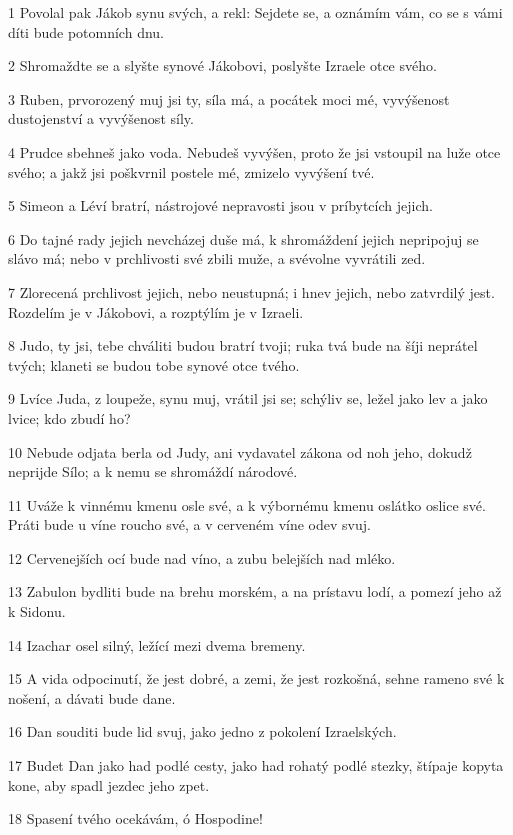 \par 1 Povolal pak Jákob synu svých, a rekl: Sejdete se, a oznámím vám, co se s vámi díti bude potomních dnu.
\par 2 Shromaždte se a slyšte synové Jákobovi, poslyšte Izraele otce svého.
\par 3 Ruben, prvorozený muj jsi ty, síla má, a pocátek moci mé, vyvýšenost dustojenství a vyvýšenost síly.
\par 4 Prudce sbehneš jako voda. Nebudeš vyvýšen, proto že jsi vstoupil na luže otce svého; a jakž jsi poškvrnil postele mé, zmizelo vyvýšení tvé.
\par 5 Simeon a Léví bratrí, nástrojové nepravosti jsou v príbytcích jejich.
\par 6 Do tajné rady jejich nevcházej duše má, k shromáždení jejich nepripojuj se slávo má; nebo v prchlivosti své zbili muže, a svévolne vyvrátili zed.
\par 7 Zlorecená prchlivost jejich, nebo neustupná; i hnev jejich, nebo zatvrdilý jest. Rozdelím je v Jákobovi, a rozptýlím je v Izraeli.
\par 8 Judo, ty jsi, tebe chváliti budou bratrí tvoji; ruka tvá bude na šíji neprátel tvých; klaneti se budou tobe synové otce tvého.
\par 9 Lvíce Juda, z loupeže, synu muj, vrátil jsi se; schýliv se, ležel jako lev a jako lvice; kdo zbudí ho?
\par 10 Nebude odjata berla od Judy, ani vydavatel zákona od noh jeho, dokudž neprijde Sílo; a k nemu se shromáždí národové.
\par 11 Uváže k vinnému kmenu osle své, a k výbornému kmenu oslátko oslice své. Práti bude u víne roucho své, a v cerveném víne odev svuj.
\par 12 Cervenejších ocí bude nad víno, a zubu belejších nad mléko.
\par 13 Zabulon bydliti bude na brehu morském, a na prístavu lodí, a pomezí jeho až k Sidonu.
\par 14 Izachar osel silný, ležící mezi dvema bremeny.
\par 15 A vida odpocinutí, že jest dobré, a zemi, že jest rozkošná, sehne rameno své k nošení, a dávati bude dane.
\par 16 Dan souditi bude lid svuj, jako jedno z pokolení Izraelských.
\par 17 Budet Dan jako had podlé cesty, jako had rohatý podlé stezky, štípaje kopyta kone, aby spadl jezdec jeho zpet.
\par 18 Spasení tvého ocekávám, ó Hospodine!
